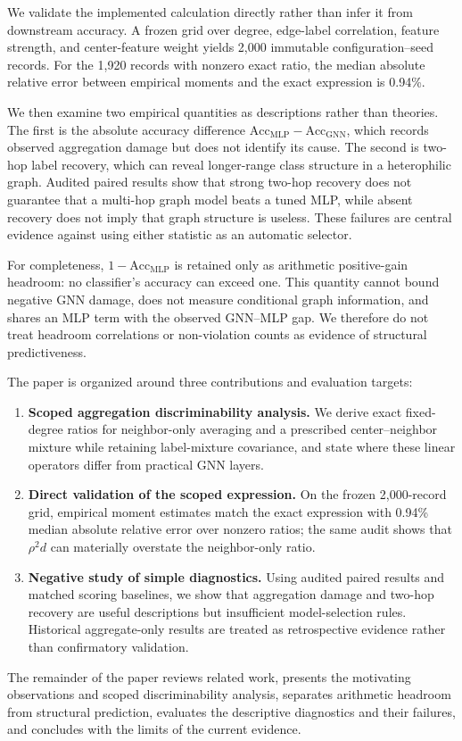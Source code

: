 We validate the implemented calculation directly rather than infer it from downstream accuracy. A frozen grid over degree, edge-label correlation, feature strength, and center-feature weight yields 2,000 immutable configuration--seed records. For the 1,920 records with nonzero exact ratio, the median absolute relative error between empirical moments and the exact expression is 0.94\%.

We then examine two empirical quantities as descriptions rather than theories. The first is the absolute accuracy difference $\mathrm{Acc}_{\mathrm{MLP}}-\mathrm{Acc}_{\mathrm{GNN}}$, which records observed aggregation damage but does not identify its cause. The second is two-hop label recovery, which can reveal longer-range class structure in a heterophilic graph. Audited paired results show that strong two-hop recovery does not guarantee that a multi-hop graph model beats a tuned MLP, while absent recovery does not imply that graph structure is useless. These failures are central evidence against using either statistic as an automatic selector.

For completeness, $1-\mathrm{Acc}_{\mathrm{MLP}}$ is retained only as arithmetic positive-gain headroom: no classifier's accuracy can exceed one. This quantity cannot bound negative GNN damage, does not measure conditional graph information, and shares an MLP term with the observed GNN--MLP gap. We therefore do not treat headroom correlations or non-violation counts as evidence of structural predictiveness.

The paper is organized around three contributions and evaluation targets:
\begin{enumerate}
    \item \textbf{Scoped aggregation discriminability analysis.} We derive exact fixed-degree ratios for neighbor-only averaging and a prescribed center--neighbor mixture while retaining label-mixture covariance, and state where these linear operators differ from practical GNN layers.
    \item \textbf{Direct validation of the scoped expression.} On the frozen 2,000-record grid, empirical moment estimates match the exact expression with 0.94\% median absolute relative error over nonzero ratios; the same audit shows that $\rho^2d$ can materially overstate the neighbor-only ratio.
    \item \textbf{Negative study of simple diagnostics.} Using audited paired results and matched scoring baselines, we show that aggregation damage and two-hop recovery are useful descriptions but insufficient model-selection rules. Historical aggregate-only results are treated as retrospective evidence rather than confirmatory validation.
\end{enumerate}

The remainder of the paper reviews related work, presents the motivating observations and scoped discriminability analysis, separates arithmetic headroom from structural prediction, evaluates the descriptive diagnostics and their failures, and concludes with the limits of the current evidence.
